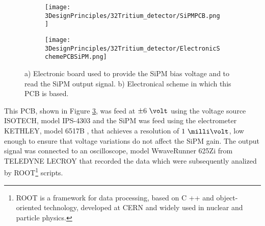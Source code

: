 \begin{figure}
\centering
    \begin{subfigure}[b]{0.5\textwidth}
    \centering
    \texttt{[image: 3DesignPrinciples/32Tritium\_detector/SiPMPCB.png]}  
    \caption{\label{subfig:ElectronicBoardSiPM}}
    \end{subfigure}
    \hfill
    \begin{subfigure}[b]{0.45\textwidth}
    \centering
    \texttt{[image: 3DesignPrinciples/32Tritium\_detector/ElectronicSchemePCBSiPM.png]}  
    \caption{\label{subfig:ElectronicSchemePCBSiPM}}
    \end{subfigure}
    \hfill
 \caption{a) Electronic board used to provide the SiPM bias voltage and to read the SiPM output signal. b) Electronical scheme in which this PCB is based.}
 \label{fig:PCBSiPM}
\end{figure}
This PCB, shown in Figure \ref{fig:PCBSiPM}, was feed at $\pm6~\volt$ using the voltage source ISOTECH, model IPS-4303 \cite{VoltageSourceISOTECH} and the SiPM was feed using the electrometer KETHLEY, model 6517B \cite{VoltageSourceKethley}, that achieves a resolution of $1~\milli\volt$, low enough to ensure that voltage variations do not affect the SiPM gain. The output signal was connected to an oscilloscope, model WwaveRunner 625Zi from TELEDYNE LECROY \cite{OscilloscopeIFIMED} that recorded the data which were subsequently analized by ROOT\footnote{ROOT is a framework for data processing, based on C ++ and object-oriented technology, developed at CERN and widely used in nuclear and particle physics.} scripts.